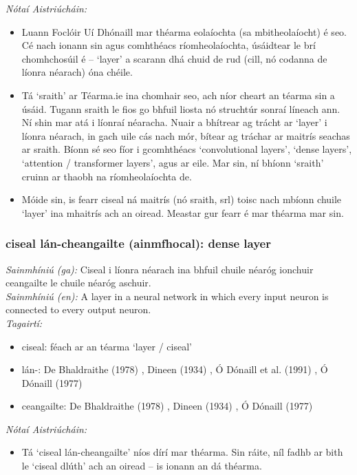 \documentclass{article}
\begin{document}
 \noindent \textit{Nótaí Aistriúcháin:}
\begin{itemize}
	\item Luann Foclóir Uí Dhónaill mar théarma eolaíochta (sa mbitheolaíocht) é seo. Cé nach ionann sin agus comhthéacs ríomheolaíochta, úsáidtear le brí chomhchosúil é -- `layer' a scarann dhá chuid de rud (cill, nó codanna de líonra néarach) óna chéile.
	\item Tá `sraith' ar Téarma.ie ina chomhair seo, ach níor cheart an téarma sin a úsáid. Tugann sraith le fios go bhfuil liosta nó struchtúr sonraí líneach ann. Ní shin mar atá i líonraí néaracha. Nuair a bhítrear ag trácht ar `layer' i líonra néarach, in gach uile cás nach mór, bítear ag tráchar ar maitrís seachas ar sraith. Bíonn sé seo fíor i gcomhthéacs `convolutional layers', `dense layers', `attention / transformer layers', agus ar eile. Mar sin, ní bhíonn `sraith' cruinn ar thaobh na ríomheolaíochta de.
	\item Móide sin, is fearr ciseal ná maitrís (nó sraith, srl) toisc nach mbíonn chuile `layer' ina mhaitrís ach an oiread. Meastar gur fearr é mar théarma mar sin.
\end{itemize}


\subsubsection*{ciseal lán-cheangailte (ainmfhocal): dense layer}
 \noindent \textit{Sainmhíniú (ga):} Ciseal i líonra néarach ina bhfuil chuile néaróg ionchuir ceangailte le chuile néaróg aschuir.
\\
 \noindent \textit{Sainmhíniú (en):} A layer in a neural network in which every input neuron is connected to every output neuron.
\\
 \noindent \textit{Tagairtí:}
\begin{itemize}
	\item ciseal: féach ar an téarma `layer / ciseal'
	\item lán-: De Bhaldraithe (1978) \cite{de-bhaldraithe}, Dineen (1934) \cite{dineen}, Ó Dónaill et al. (1991) \cite{focloir-beag}, Ó Dónaill (1977) \cite{odonaill}
	\item ceangailte: De Bhaldraithe (1978) \cite{de-bhaldraithe}, Dineen (1934) \cite{dineen}, Ó Dónaill (1977) \cite{odonaill}
\end{itemize}

 \noindent \textit{Nótaí Aistriúcháin:}
\begin{itemize}
	\item Tá `ciseal lán-cheangailte' níos dírí mar théarma. Sin ráite, níl fadhb ar bith le `ciseal dlúth' ach an oiread -- is ionann an dá théarma.
\end{itemize}
\end{document}
